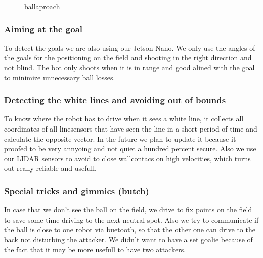 \documentclass{scrartcl}
\begin{document}
\begin{figure}[!h]
    \begin{center}
    \caption{ballaproach}
    \label{balla}
    \end{center}
    \end{figure}
    
\subsubsection{Aiming at the goal}
To detect the goals we are also using our Jetson Nano. We only use the angles of the goals for the positioning on the field
and shooting in the right direction and not blind. The bot only shoots when it is in range and good alined with the goal to minimize unnecessary ball losses.

\subsubsection{Detecting the white lines and avoiding out of bounds}
To know where the robot has to drive when it sees a white line, it collects all coordinates of all linesensors that have seen the line in a short period of time
and calculate the opposite vector. In the future we plan to update it because it proofed to be very annyoing and not quiet a hundred percent secure.
Also we use our LIDAR sensors to avoid to close wallcontacs on high velocities, which turns out really reliable and usefull.

\subsubsection{Special tricks and gimmics (butch)}
In case that we don't see the ball on the field, we drive to fix points on the field to save some time driving to the next neutral spot.
Also we try to communicate if the ball is close to one robot via buetooth, so that the other one can drive to the back not disturbing the attacker.
We didn't want to have a set goalie because of the fact that it may be more usefull to have two attackers.
\end{document}

